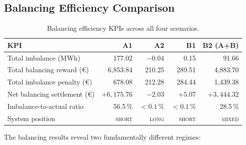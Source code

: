 \subsection{Balancing Efficiency Comparison}

\begin{table}[htbp]
\centering
\caption{Balancing efficiency KPIs across all four scenarios.}
\label{tab:balancing_comparison}
\renewcommand{\arraystretch}{1.35}
\begin{tabular}{@{}lrrrr@{}}
\toprule
\textbf{KPI}                     & \textbf{A1}   & \textbf{A2}   & \textbf{B1}   & \textbf{B2 (A+B)} \\
\midrule
Total imbalance (MWh)            & 177.02        & $-0.04$       & 0.15          & 91.66  \\
Total balancing reward (€)       & 6{,}853.84    & 210.25        & 289.51        & 4{,}883.70 \\
Total imbalance penalty (€)      & 678.08        & 212.28        & 284.44        & 1{,}439.38 \\
Net balancing settlement (€)     & $+6{,}175.76$ & $-2.03$       & $+5.07$       & $+3{,}444.32$ \\
Imbalance-to-actual ratio        & 56.5\,\%      & $<0.1$\,\%    & $<0.1$\,\%    & 28.5\,\% \\
System position                  & \textsc{short}& \textsc{long} & \textsc{short}& \textsc{mixed} \\
\bottomrule
\end{tabular}
\end{table}

The balancing results reveal two fundamentally different regimes:

